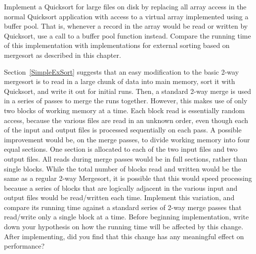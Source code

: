 \begin{projects}
\item
Implement a Quicksort for large files on disk by replacing all array
access in the normal Quicksort application with access to a virtual
array implemented using a buffer pool.
That is, whenever a record in the array would be read or written by
Quicksort, use a call to a buffer pool function instead.
Compare the running time of this implementation with implementations
for external sorting based on mergesort as described in this chapter.

\item
Section~\ref{SimpleExSort} suggests that an easy modification to the
basic 2-way mergesort is to read in a large chunk of data into main
memory, sort it with Quicksort, and write it out for initial runs.
Then, a standard 2-way merge is used in a series of passes to merge
the runs together.
However, this makes use of only two blocks of working memory at a
time.
Each block read is essentially random access, because the various files
are read in an unknown order, even though each of the input and output
files is processed sequentially on each pass.
A possible improvement would be, on the merge passes, to divide
working memory into four equal sections.
One section is allocated to each of the two input files and two output
files.
All reads during merge passes would be in full sections, rather than
single blocks.
While the total number of blocks read and written would be the same as
a regular 2-way Mergesort, it is possible that this would speed
processing because a series of blocks that are logically adjacent in
the various input and output files would be read/written each time.
Implement this variation, and compare its running time against a
standard series of 2-way merge passes that read/write only a single
block at a time.
Before beginning implementation, write down your hypothesis on how the
running time will be affected by this change.
After implementing, did you find that this change has any meaningful
effect on performance?
\end{projects}
